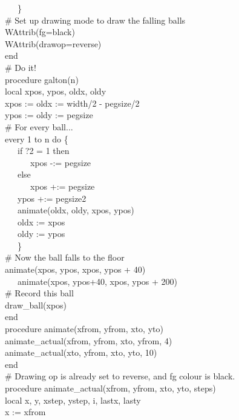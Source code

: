 {\>   \ \ \ \} \\
\>   \# Set up drawing mode to draw the falling balls \\
\>   WAttrib({\textquotedbl}fg=black{\textquotedbl}) \\
\>   WAttrib({\textquotedbl}drawop=reverse{\textquotedbl}) \\
end
\ \\
\# Do it! \\
procedure galton(n) \\
local xpos, ypos, oldx, oldy \\
\>   xpos := oldx := width/2 - pegsize/2 \\
\>   ypos := oldy := pegsize \\
\>   \# For every ball... \\
\>   every 1 to n do \{ \\
\>   \ \ \ if ?2 = 1 then \\
\>   \ \ \ \ \ \ xpos -:= pegsize \\
\>   \ \ \ else \\
\>   \ \ \ \ \ \ xpos +:= pegsize \\
\>   \ \ \ ypos +:= pegsize2 \\
\>   \ \ \ animate(oldx, oldy, xpos, ypos) \\
\>   \ \ \ oldx := xpos \\
\>   \ \ \ oldy := ypos \\
\>   \ \ \ \} \\
\>   \# Now the ball falls to the floor \\
\>   animate(xpos, ypos, xpos, ypos + 40) \\
\ \ \ animate(xpos, ypos+40, xpos, ypos + 200) \\
\>   \# Record this ball \\
\>   draw\_ball(xpos) \\
end
\ \\
procedure animate(xfrom, yfrom, xto, yto) \\
\>   animate\_actual(xfrom, yfrom, xto, yfrom, 4) \\
\>   animate\_actual(xto, yfrom, xto, yto, 10) \\
end
\ \\
\# Drawing op is already set to {\textquotedbl}reverse{\textquotedbl},
and fg colour is black. \\
procedure animate\_actual(xfrom, yfrom, xto, yto, steps) \\
local x, y, xstep, ystep, i, lastx, lasty \\
\>   x := xfrom \\
}

